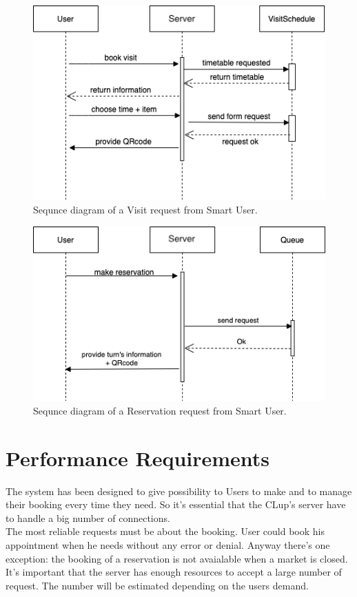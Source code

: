 \begin{figure}[H]
  \caption{Sequnce diagram of a Visit request from Smart User.}
  \label{fig:SD_visit}
  \centering
  \includegraphics[scale=0.45]{diagrams/SD_visit.png}

\end{figure}



\begin{figure}[H]
  \caption{Sequnce diagram of a Reservation request from Smart User.}
  \label{fig:SD_reservation}
  \centering
  \includegraphics[scale=0.45]{diagrams/SD_reservation.png}

\end{figure}

\medskip

\section{Performance Requirements}
The system has been designed to give possibility to Users to make and to manage their booking every time they need. So it's essential that the CLup's server have to handle a big number of connections. \\
The most reliable requests must be about the booking. User could book his appointment when he needs without any error or denial. 
Anyway there's one exception: the booking of a reservation is not avaialable when a market is closed.\\
It's important that the server has enough resources to accept a large number of request. The number will be estimated depending on the users demand.
\medskip

